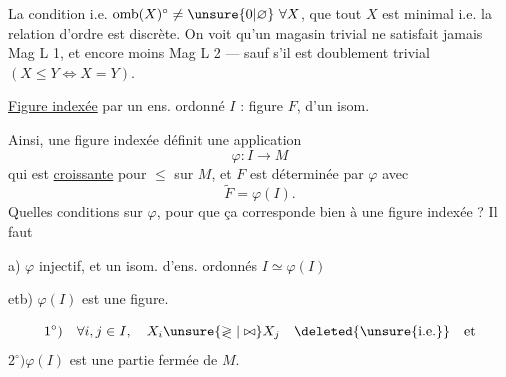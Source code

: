 La condition  i.e. $\mathrm{omb}(X)^\circ\ne\unsure{0|\varnothing}\ \forall X$,  que tout $X$ est minimal i.e. la relation d'ordre est discrète. On voit qu'un magasin trivial ne satisfait  jamais Mag L 1, et encore moins Mag L 2 --- sauf s'il est doublement trivial $(X\leq Y\Longleftrightarrow X=Y)$.


\uline{Figure indexée} par un ens. ordonné $I$ : figure $F$,  d'un isom.

Ainsi, une figure indexée  définit une application
\[
\varphi:I\longrightarrow M
\]
qui est \uline{croissante} pour $\leq$ sur $M$,  et $F$ est déterminée par $\varphi$  avec
\[
\widetilde F=\varphi(I).
\]
Quelles conditions sur $\varphi$, pour que ça corresponde bien à une figure indexée ? Il faut

 a) $\varphi$ injectif, et \deleted{$=$}  un isom. d'ens. ordonnés $I\simeq\varphi(I)$

et\qquad b) $\varphi(I)$ est une figure.   

\[
1^\circ)\quad\forall i,j\in I,\quad X_i\unsure{\gtrless|\bowtie}X_j\quad\deleted{\unsure{\text{i.e.}}}\quad\text{et}
\]
$2^\circ)$\quad $\varphi(I)$ est une partie fermée de $M$.

